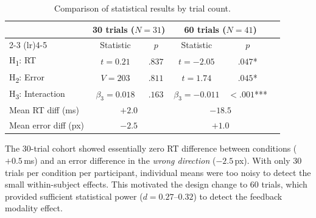 \documentclass[12pt,letterpaper]{article}
\begin{document}
\begin{table}[H]
\centering
\caption{Comparison of statistical results by trial count.}
\label{tab:30v60}
\begin{tabular}{lccccc}
\toprule
& \multicolumn{2}{c}{\textbf{30 trials ($N=31$)}} & \multicolumn{2}{c}{\textbf{60 trials ($N=41$)}} \\
\cmidrule(lr){2-3} \cmidrule(lr){4-5}
& Statistic & $p$ & Statistic & $p$ \\
\midrule
H\textsubscript{1}: RT & $t = 0.21$ & $.837$ & $t = -2.05$ & $.047$* \\
H\textsubscript{2}: Error & $V = 203$ & $.811$ & $t = 1.74$ & $.045$* \\
H\textsubscript{3}: Interaction & $\beta_3 = 0.018$ & $.163$ & $\beta_3 = -0.011$ & $<.001$*** \\
\midrule
Mean RT diff (ms) & \multicolumn{2}{c}{$+2.0$} & \multicolumn{2}{c}{$-18.5$} \\
Mean error diff (px) & \multicolumn{2}{c}{$-2.5$} & \multicolumn{2}{c}{$+1.0$} \\
\bottomrule
\end{tabular}
\end{table}

The 30-trial cohort showed essentially zero RT difference between conditions ($+0.5$\,ms) and an error difference in the \emph{wrong direction} ($-2.5$\,px). With only 30 trials per condition per participant, individual means were too noisy to detect the small within-subject effects. This motivated the design change to 60 trials, which provided sufficient statistical power ($d = 0.27$--$0.32$) to detect the feedback modality effect.

\
\end{document}
